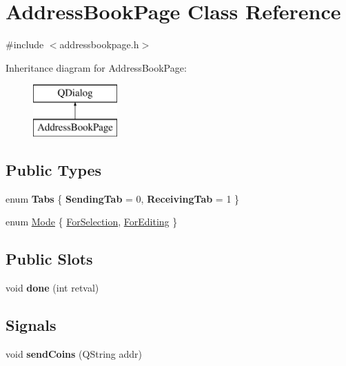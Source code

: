 \hypertarget{class_address_book_page}{}\section{Address\+Book\+Page Class Reference}
\label{class_address_book_page}


{\ttfamily \#include $<$addressbookpage.\+h$>$}

Inheritance diagram for Address\+Book\+Page\+:\begin{figure}[H]
\begin{center}
\leavevmode
\includegraphics[height=2.000000cm]{class_address_book_page}
\end{center}
\end{figure}
\subsection*{Public Types}
\begin{DoxyCompactItemize}
\item 
\mbox{\label{class_address_book_page_a7ef3cf6c3e4613894af313a05335dbe3}} 
enum {\bfseries Tabs} \{ {\bfseries Sending\+Tab} = 0, 
{\bfseries Receiving\+Tab} = 1
 \}
\item 
enum \mbox{\hyperlink{class_address_book_page_a0a8f8e590dc6f18e829fde039f984464}{Mode}} \{ \mbox{\hyperlink{class_address_book_page_a0a8f8e590dc6f18e829fde039f984464aaadd19edc662b5516c378a7cc8599fdb}{For\+Selection}}, 
\mbox{\hyperlink{class_address_book_page_a0a8f8e590dc6f18e829fde039f984464a86b6565fcddce6edf578c0e470471296}{For\+Editing}}
 \}
\end{DoxyCompactItemize}
\subsection*{Public Slots}
\begin{DoxyCompactItemize}
\item 
\mbox{\label{class_address_book_page_a4f585f3ff33a3c7066b2fcda803f862f}} 
void {\bfseries done} (int retval)
\end{DoxyCompactItemize}
\subsection*{Signals}
\begin{DoxyCompactItemize}
\item 
\mbox{\label{class_address_book_page_a55b3324b3f39d8f0ca3c23f2d1ad3cb1}} 
void {\bfseries send\+Coins} (Q\+String addr)
\end{DoxyCompactItemize}
